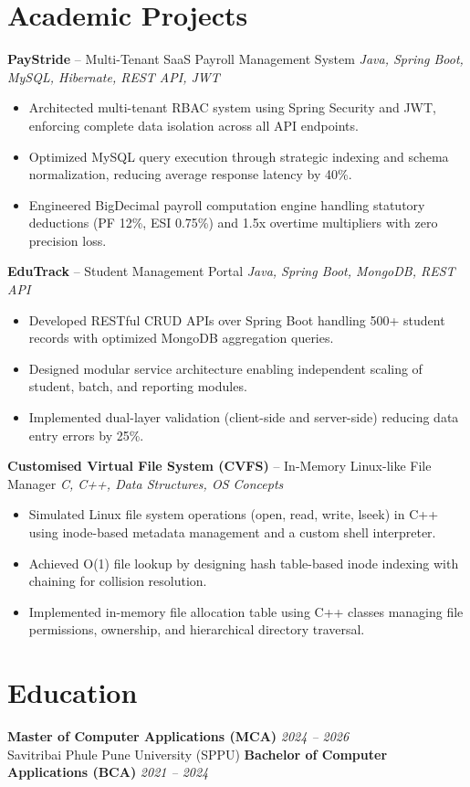 \documentclass[10.5pt,a4paper]{article}
\begin{document}
\section{Academic Projects}
\textbf{PayStride} -- Multi-Tenant SaaS Payroll Management System \hfill \textit{Java, Spring Boot, MySQL, Hibernate, REST API, JWT}
\begin{itemize}
  \item Architected multi-tenant RBAC system using Spring Security and JWT, enforcing complete data isolation across all API endpoints.
  \item Optimized MySQL query execution through strategic indexing and schema normalization, reducing average response latency by 40\%.
  \item Engineered BigDecimal payroll computation engine handling statutory deductions (PF 12\%, ESI 0.75\%) and 1.5x overtime multipliers with zero precision loss.
\end{itemize}
\vspace{2pt}
\textbf{EduTrack} -- Student Management Portal \hfill \textit{Java, Spring Boot, MongoDB, REST API}
\begin{itemize}
  \item Developed RESTful CRUD APIs over Spring Boot handling 500+ student records with optimized MongoDB aggregation queries.
  \item Designed modular service architecture enabling independent scaling of student, batch, and reporting modules.
  \item Implemented dual-layer validation (client-side and server-side) reducing data entry errors by 25\%.
\end{itemize}
\vspace{2pt}
\textbf{Customised Virtual File System (CVFS)} -- In-Memory Linux-like File Manager \hfill \textit{C, C++, Data Structures, OS Concepts}
\begin{itemize}
  \item Simulated Linux file system operations (open, read, write, lseek) in C++ using inode-based metadata management and a custom shell interpreter.
  \item Achieved O(1) file lookup by designing hash table-based inode indexing with chaining for collision resolution.
  \item Implemented in-memory file allocation table using C++ classes managing file permissions, ownership, and hierarchical directory traversal.
\end{itemize}
\section{Education}
\textbf{Master of Computer Applications (MCA)} \hfill \textit{2024 – 2026}\\
Savitribai Phule Pune University (SPPU) \hfill 
\vspace{2pt}
\textbf{Bachelor of Computer Applications (BCA)} \hfill \textit{2021 – 2024}\\
 \hfill 
\vspace{2pt}
\end{document}
